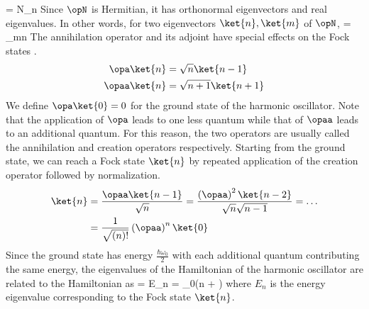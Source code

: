 \beq
\opN{} = N_n
\eeq
Since $\opN$ is Hermitian, it has orthonormal eigenvectors and real eigenvalues. In other words, for two eigenvectors $\ket{n},\ket{m}$ of $\opN$, 
\beq
{} = \delta_{mn}
\eeq
The annihilation operator and its adjoint have special effects on the Fock states \cite{griffiths}.
\begin{align}
\opa\ket{n} &= \sqrt{n}\ket{n-1}\\
\opaa\ket{n} &= \sqrt{n+1}\ket{n+1}
\end{align}
We define $\opa\ket{0} = 0$ for the ground state of the harmonic oscillator. Note that the application of $\opa$ leads to one less quantum while that of $\opaa$ leads to an additional quantum. For this reason, the two operators are usually called the annihilation and creation operators respectively. Starting from the ground state, we can reach a Fock state $\ket{n}$ by repeated application of the creation operator followed by normalization.
\begin{align}
\ket{n} &= \frac{\opaa\ket{n-1}}{\sqrt{n}} = \frac{\left(\opaa\right)^2\ket{n-2}}{\sqrt{n}\sqrt{n-1}}=\ldots\\
&= \frac{1}{\sqrt{\left(n\right)!}}\left(\opaa\right)^n\ket{0}
\end{align}
Since the ground state has energy $\frac{\hbar\omega_0}{2}$ with each additional quantum contributing the same energy, the eigenvalues of the Hamiltonian of the harmonic oscillator are related to the Hamiltonian as 
\beq
\opH{} = E_n = \hbar\omega_0\left(n + \right)
\eeq
where $E_n$ is the energy eigenvalue corresponding to the Fock state $\ket{n}$.
